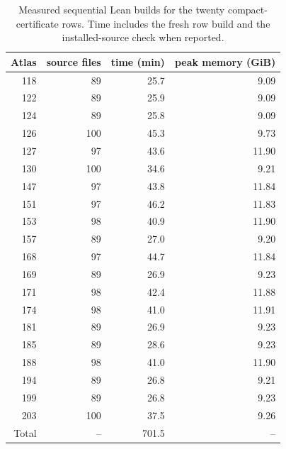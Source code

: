 \begin{table}[p]
\centering
\small
\caption{Measured sequential Lean builds for the twenty compact-certificate rows.  Time includes the fresh row build and the installed-source check when reported.}
\label{tab:verification-cost}
\begin{tabular}{rrrr}
\toprule Atlas & source files & time (min) & peak memory (GiB)\\ \midrule
118 & 89 & 25.7 & 9.09\\
122 & 89 & 25.9 & 9.09\\
124 & 89 & 25.8 & 9.09\\
126 & 100 & 45.3 & 9.73\\
127 & 97 & 43.6 & 11.90\\
130 & 100 & 34.6 & 9.21\\
147 & 97 & 43.8 & 11.84\\
151 & 97 & 46.2 & 11.83\\
153 & 98 & 40.9 & 11.90\\
157 & 89 & 27.0 & 9.20\\
168 & 97 & 44.7 & 11.84\\
169 & 89 & 26.9 & 9.23\\
171 & 98 & 42.4 & 11.88\\
174 & 98 & 41.0 & 11.91\\
181 & 89 & 26.9 & 9.23\\
185 & 89 & 28.6 & 9.23\\
188 & 98 & 41.0 & 11.90\\
194 & 89 & 26.8 & 9.21\\
199 & 89 & 26.8 & 9.23\\
203 & 100 & 37.5 & 9.26\\
\midrule
Total & -- & 701.5 & --\\
\bottomrule
\end{tabular}
\end{table}
